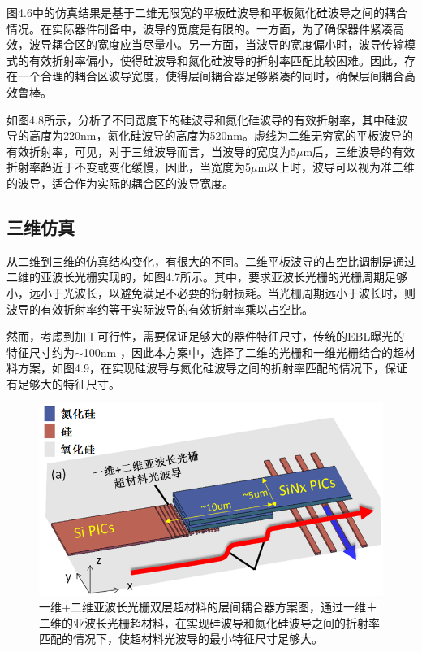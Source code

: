 图4.6中的仿真结果是基于二维无限宽的平板硅波导和平板氮化硅波导之间的耦合情况。在实际器件制备中，波导的宽度是有限的。一方面，为了确保器件紧凑高效，波导耦合区的宽度应当尽量小。另一方面，当波导的宽度偏小时，波导传输模式的有效折射率偏小，使得硅波导和氮化硅波导的折射率匹配比较困难。因此，存在一个合理的耦合区波导宽度，使得层间耦合器足够紧凑的同时，确保层间耦合高效鲁棒。

如图4.8所示，分析了不同宽度下的硅波导和氮化硅波导的有效折射率，其中硅波导的高度为220nm，氮化硅波导的高度为520nm。虚线为二维无穷宽的平板波导的有效折射率，可见，对于三维波导而言，当波导的宽度为5$\mu$m后，三维波导的有效折射率趋近于不变或变化缓慢，因此，当宽度为5$\mu$m以上时，波导可以视为准二维的波导，适合作为实际的耦合区的波导宽度。\cite{Luyssaert2005Efficient}

\subsection{三维仿真}

从二维到三维的仿真结构变化，有很大的不同。二维平板波导的占空比调制是通过二维的亚波长光栅实现的，如图4.7所示。其中，要求亚波长光栅的光栅周期足够小，远小于光波长，以避免满足不必要的衍射损耗。当光栅周期远小于波长时，则波导的有效折射率约等于实际波导的有效折射率乘以占空比。

然而，考虑到加工可行性，需要保证足够大的器件特征尺寸，传统的EBL曝光的特征尺寸约为$\sim$100nm \cite{Piggott2017Fabrication}，因此本方案中，选择了二维的光栅和一维光栅结合的超材料方案，如图4.9，在实现硅波导与氮化硅波导之间的折射率匹配的情况下，保证有足够大的特征尺寸。

\begin{figure}[!htbp]
    \centering
    \includegraphics[width=1\textwidth]{Img/4-9.png}
    \caption{一维+二维亚波长光栅双层超材料的层间耦合器方案图，通过一维＋二维的亚波长光栅超材料，在实现硅波导和氮化硅波导之间的折射率匹配的情况下，使超材料光波导的最小特征尺寸足够大。}
    \label{fig:4-9}
\end{figure}

